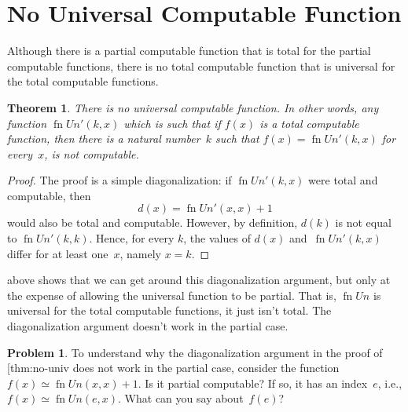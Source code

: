\documentclass[10pt,a4paper]{article}
\makeatletter
\theoremstyle{plain}
\newtheorem{thm}{Theorem}[section]
\theoremstyle{definition}
\newtheorem{prob}{Problem}[section]
\theoremstyle{remark}
\newenvironment{explain}{}{}
\newcommand*{\olfileid}[3]{}
\newcommand*{\olsection}[1]{\section*{#1}}
\newcommand*{\ollabel}[1]{\label{#1}}
\newcommand{\olref}{\@ifnextchar[{\olref@i}{\olref@final}}
\def\olref@i[#1]{\@ifnextchar[{\olref@ii}{\olref@final}}
\def\olref@ii[#1]{\@ifnextchar[{\olref@iii}{\olref@final}}
\def\olref@iii[#1]{\olref@final}
\def\olref@final#1{\ref{#1}}
\providecommand{\fn}{\operatorname{fn}}
\makeatother
\begin{document}



\olfileid{cmp}{thy}{nou}
\olsection{No Universal Computable Function}

Although there is a partial computable function that is total for the
partial computable functions, there is no total computable
function that is universal for the total computable functions. 

\begin{thm}
\ollabel{thm:no-univ}
There is no universal computable function. In other words, any
function $\fn{Un}'(k, x)$ which is such that if $f(x)$ is a total
computable function, then there is a natural number~$k$ such that
$f(x) = \fn{Un}'(k,x)$ for every~$x$, is not computable.
\end{thm}

\begin{proof}
The proof is a simple diagonalization: if $\fn{Un}'(k,x)$ were total
and computable, then
\[
d(x) = \fn{Un}'(x, x) + 1
\]
would also be total and computable. However, by definition, $d(k)$ is
not equal to $\fn{Un}'(k,k)$. Hence, for every $k$, the values of
$d(x)$ and~$\fn{Un}'(k, x)$ differ for at least one~$x$, namely $x = k$.
\end{proof}

\begin{explain}
\olref[uni]{thm:univ-comp} above shows that we can get around this
diagonalization argument, but only at the expense of allowing the
universal function to be partial. That is, $\fn{Un}$ is universal for
the total computable functions, it just isn't total. The
diagonalization argument doesn't work in the partial case. 
\end{explain}

\begin{prob}
  To understand why the diagonalization argument in the proof of
  \olref{thm:no-univ} does not work in the partial
  case, consider the function $f(x) \simeq \fn{Un}(x,x)+1$. Is it
  partial computable? If so, it has an index~$e$, i.e., $f(x) \simeq
  \fn{Un}(e,x)$. What can you say about~$f(e)$?
\end{prob}



\end{document}

